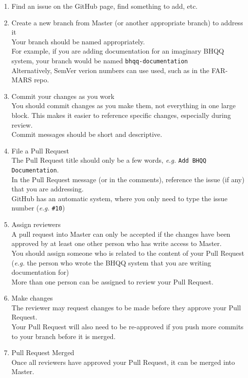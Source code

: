 \documentclass{article}
\begin{document}
\begin{enumerate}
	\item Find an issue on the GitHub page, find something to add, etc.
	\item Create a new branch from Master (or another appropriate branch) to address it
		\\ Your branch should be named appropriately.
		\\ For example, if you are adding documentation for an imaginary BHQQ system, your branch would be named \texttt{bhqq-documentation}
		\\Alternatively, SemVer verion numbers can use used, such as in the FAR-MARS repo.
	\item Commit your changes as you work
		\\You should commit changes as you make them, not everything in one large block. This makes it easier to reference specific changes, especially during review.
		\\Commit messages should be short and descriptive.
	\item File a Pull Request
		\\The Pull Request title should only be a few words, \textit{e.g.} \texttt{Add BHQQ Documentation}.
		\\In the Pull Request message (or in the comments), reference the issue (if any) that you are addressing.
		\\GitHub has an automatic system, where you only need to type the issue number (\textit{e.g.} \texttt{\#10})
	\item Assign reviewers
		\\A pull request into Master can only be accepted if the changes have been approved by at least one other person who has write access to Master.
		\\You should assign someone who is related to the content of your Pull Request (\textit{e.g.} the person who wrote the BHQQ system that you are writing documentation for)
		\\More than one person can be assigned to review your Pull Request.
	\item Make changes
		\\The reviewer may request changes to be made before they approve your Pull Request.
		\\Your Pull Request will also need to be re-approved if you push more commits to your branch before it is merged.
	\item Pull Request Merged
		\\Once all reviewers have approved your Pull Request, it can be merged into Master.
\end{enumerate}
\end{document}
